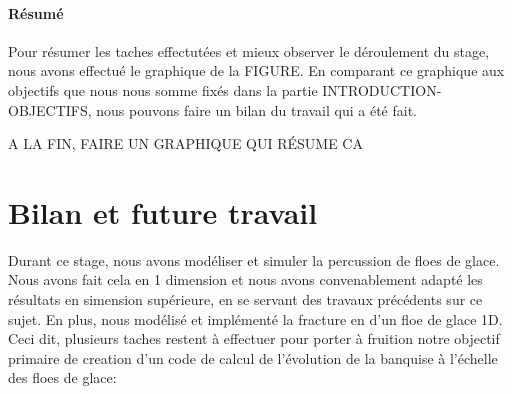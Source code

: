 \paragraph{Résumé}
Pour résumer les taches effectutées et mieux observer le déroulement du stage, nous avons effectué le graphique de la FIGURE. En comparant ce graphique aux objectifs que nous nous somme fixés dans la partie INTRODUCTION-OBJECTIFS, nous pouvons faire un bilan du travail qui a été fait.

A LA FIN, FAIRE UN GRAPHIQUE QUI RÉSUME CA








\section{Bilan et future travail}

Durant ce stage, nous avons modéliser et simuler la percussion de floes de glace. Nous avons fait cela en 1 dimension et nous avons convenablement adapté les résultats en simension supérieure, en se servant des travaux précédents sur ce sujet. En plus, nous modélisé et implémenté la fracture en d'un floe de glace 1D. Ceci dit, plusieurs taches restent à effectuer pour porter à fruition notre objectif primaire de creation d'un code de calcul de l’évolution de la banquise à l’échelle des floes de glace:

